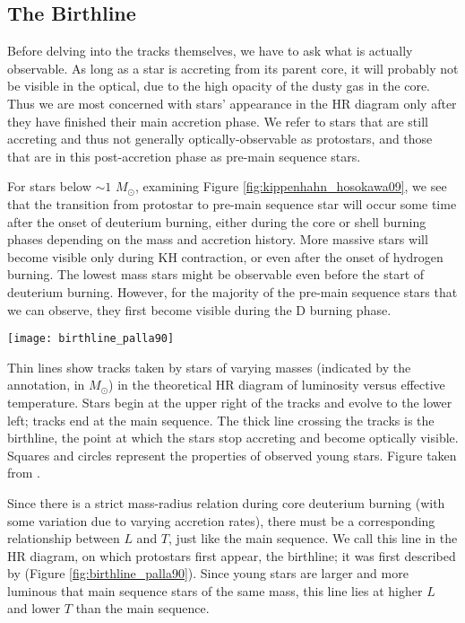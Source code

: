 \subsection{The Birthline}

Before delving into the tracks themselves, we have to ask what is actually observable. As long as a star is accreting from its parent core, it will probably not be visible in the optical, due to the high opacity of the dusty gas in the core. Thus we are most concerned with stars' appearance in the HR diagram only after they have finished their main accretion phase. We refer to stars that are still accreting and thus not generally optically-observable as protostars, and those that are in this post-accretion phase as pre-main sequence stars. 

For stars below $\sim 1$ $M_\odot$, examining Figure \ref{fig:kippenhahn_hosokawa09}, we see that the transition from protostar to pre-main sequence star will occur some time after the onset of deuterium burning, either during the core or shell burning phases depending on the mass and accretion history. More massive stars will become visible only during KH contraction, or even after the onset of hydrogen burning. The lowest mass stars might be observable even before the start of deuterium burning. However, for the majority of the pre-main sequence stars that we can observe, they first become visible during the D burning phase.

\begin{marginfigure}
\texttt{[image: birthline\_palla90]}
\caption[The protostellar birthline]{
\label{fig:birthline_palla90}
Thin lines show tracks taken by stars of varying masses (indicated by the annotation, in $M_\odot$) in the theoretical HR diagram of luminosity versus effective temperature. Stars begin at the upper right of the tracks and evolve to the lower left; tracks end at the main sequence. The thick line crossing the tracks is the birthline, the point at which the stars stop accreting and become optically visible. Squares and circles represent the properties of observed young stars. Figure taken from \citet{palla90a}.
}
\end{marginfigure}

Since there is a strict mass-radius relation during core deuterium burning (with some variation due to varying accretion rates), there must be a corresponding relationship between $L$ and $T$, just like the main sequence. We call this line in the HR diagram, on which protostars first appear, the birthline; it was first described by \citet{palla90a} (Figure \ref{fig:birthline_palla90}). Since young stars are larger and more luminous that main sequence stars of the same mass, this line lies at higher $L$ and lower $T$ than the main sequence.

